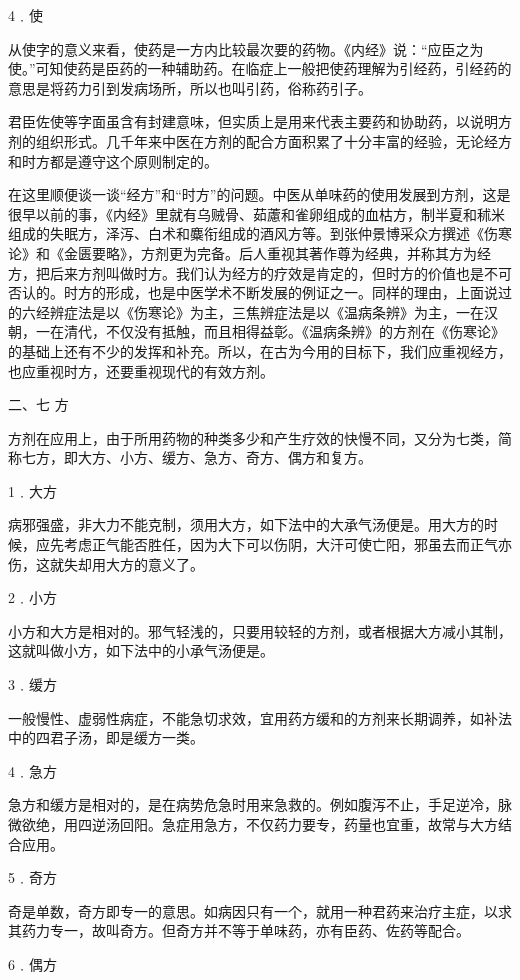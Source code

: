 \documentclass[12pt,UTF8]{ctexbook}
\begin{document}
4﹒使

从使字的意义来看，使药是一方内比较最次要的药物。《内经》说：“应臣之为使。”可知使药是臣药的一种辅助药。在临症上一般把使药理解为引经药，引经药的意思是将药力引到发病场所，所以也叫引药，俗称药引子。

君臣佐使等字面虽含有封建意味，但实质上是用来代表主要药和协助药，以说明方剂的组织形式。几千年来中医在方剂的配合方面积累了十分丰富的经验，无论经方和时方都是遵守这个原则制定的。

在这里顺便谈一谈“经方”和“时方”的问题。中医从单味药的使用发展到方剂，这是很早以前的事，《内经》里就有乌贼骨、茹藘和雀卵组成的血枯方，制半夏和秫米组成的失眠方，泽泻、白术和麋衔组成的酒风方等。到张仲景博采众方撰述《伤寒论》和《金匮要略》，方剂更为完备。后人重视其著作尊为经典，并称其方为经方，把后来方剂叫做时方。我们认为经方的疗效是肯定的，但时方的价值也是不可否认的。时方的形成，也是中医学术不断发展的例证之一。同样的理由，上面说过的六经辨症法是以《伤寒论》为主，三焦辨症法是以《温病条辨》为主，一在汉朝，一在清代，不仅没有抵触，而且相得益彰。《温病条辨》的方剂在《伤寒论》的基础上还有不少的发挥和补充。所以，在古为今用的目标下，我们应重视经方，也应重视时方，还要重视现代的有效方剂。

二、七 方

方剂在应用上，由于所用药物的种类多少和产生疗效的快慢不同，又分为七类，简称七方，即大方、小方、缓方、急方、奇方、偶方和复方。

1﹒大方

病邪强盛，非大力不能克制，须用大方，如下法中的大承气汤便是。用大方的时候，应先考虑正气能否胜任，因为大下可以伤阴，大汗可使亡阳，邪虽去而正气亦伤，这就失却用大方的意义了。

2﹒小方

小方和大方是相对的。邪气轻浅的，只要用较轻的方剂，或者根据大方减小其制，这就叫做小方，如下法中的小承气汤便是。

3﹒缓方

一般慢性、虚弱性病症，不能急切求效，宜用药方缓和的方剂来长期调养，如补法中的四君子汤，即是缓方一类。

4﹒急方

急方和缓方是相对的，是在病势危急时用来急救的。例如腹泻不止，手足逆冷，脉微欲绝，用四逆汤回阳。急症用急方，不仅药力要专，药量也宜重，故常与大方结合应用。

5﹒奇方

奇是单数，奇方即专一的意思。如病因只有一个，就用一种君药来治疗主症，以求其药力专一，故叫奇方。但奇方并不等于单味药，亦有臣药、佐药等配合。

6﹒偶方
\end{document}
